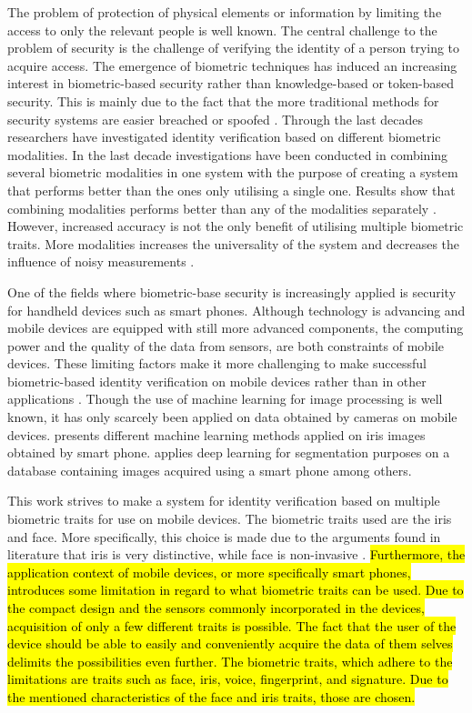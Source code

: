 The problem of protection of physical elements or information by limiting the access to only the relevant people is well known. The central challenge to the problem of security is the challenge of verifying the identity of a person trying to acquire access. The emergence of biometric techniques has induced an increasing interest in biometric-based security rather than knowledge-based or token-based security. This is mainly due to the fact  that the more traditional methods for security systems are easier breached or spoofed \citep{Ross2003}. Through the last decades researchers have investigated identity verification based on different biometric modalities. In the last decade investigations have been conducted in combining several biometric modalities in one system with the purpose of creating a system that performs better than the ones only utilising a single one. Results show that combining modalities performs better than any of the modalities separately \citep{Chen2005a}.  However, increased accuracy is not the only benefit of utilising multiple biometric traits. More modalities increases the universality of the system and decreases the influence of noisy measurements \citep{Ross2003}.

One of the fields where biometric-base security is increasingly applied is security for handheld devices such as smart phones. Although technology is advancing and mobile devices are equipped with still more advanced components, the computing power and the quality of the data from sensors, are both constraints of mobile devices. These limiting factors make it more challenging to make successful biometric-based identity verification on mobile devices rather than in other applications \citep{Kim2016}. Though the use of machine learning for image processing is well known, it has only scarcely been applied on data obtained by cameras on mobile devices. \cite{Khan2017a} presents different machine learning methods applied on iris images obtained by smart phone. \cite{Bazrafkan2017} applies deep learning for segmentation purposes on a database containing images acquired using a smart phone among others. 
 
This work strives to make a system for identity verification based on multiple biometric traits for use on mobile devices. The biometric traits used are the iris and face. More specifically, this choice is made due to the arguments found in literature that iris is very distinctive, while face is non-invasive \citep{Wang2009a}. \hl{Furthermore, the application context of mobile devices, or more specifically smart phones, introduces some limitation in regard to what biometric traits can be used. Due to the compact design and the sensors commonly incorporated in the devices, acquisition of only a few different traits is possible. The fact that the user of the device should be able to easily and conveniently acquire the data of them selves delimits the possibilities even further. The biometric traits, which adhere to the limitations are traits such as face, iris, voice, fingerprint, and signature. Due to the mentioned characteristics of the face and iris traits, those are chosen.}  